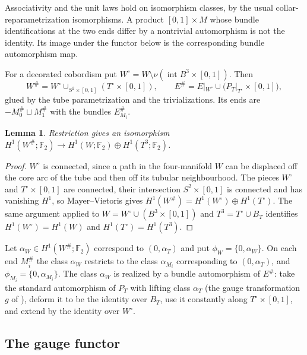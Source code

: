 \documentclass[11pt]{amsart}
\newtheorem{lemma}[theorem]{Lemma}
\theoremstyle{definition}
\theoremstyle{remark}
\theoremstyle{plain}
\numberwithin{equation}{section}
\newcommand{\FF}{\mathbb{F}_2}
\begin{document}
Associativity and the unit laws hold on isomorphism classes, by the
usual collar-reparametrization isomorphisms. A product
$[0,1]\times M$ whose bundle identifications at the two ends differ by a
nontrivial automorphism is not the identity. Its image under the functor
below is the corresponding bundle automorphism map.

For a decorated cobordism put $W^\circ=W\setminus\nu(\operatorname{int}
B^3\times[0,1])$. Then
\begin{equation}\label{eq:Wsharp}
W^\#=W^\circ\cup_{S^2\times[0,1]}(T^\circ\times[0,1]),\qquad
E^\#=E|_{W^\circ}\cup\bigl(P_T|_{T^\circ}\times[0,1]\bigr),
\end{equation}
glued by the tube parametrization and the trivializations. Its ends are
$-M_0^\#\sqcup M_1^\#$ with the bundles $E^\#_{M_i}$.

\begin{lemma}\label{lem:H1-sharp}
Restriction gives an isomorphism
$H^1(W^\#;\FF)\to H^1(W;\FF)\oplus H^1(T^3;\FF)$.
\end{lemma}

\begin{proof}
$W^\circ$ is connected, since a path in the four-manifold $W$ can be
displaced off the core arc of the tube and then off its tubular
neighbourhood. The pieces $W^\circ$ and $T^\circ\times[0,1]$ are
connected, their intersection $S^2\times[0,1]$ is connected and has
vanishing $H^1$, so Mayer--Vietoris gives
$H^1(W^\#)=H^1(W^\circ)\oplus H^1(T^\circ)$. The same argument applied to
$W=W^\circ\cup(B^3\times[0,1])$ and $T^3=T^\circ\cup B_T$ identifies
$H^1(W^\circ)=H^1(W)$ and $H^1(T^\circ)=H^1(T^3)$.
\end{proof}

Let $\alpha_W\in H^1(W^\#;\FF)$ correspond to $(0,\alpha_T)$ and put
$\phi_W=\{0,\alpha_W\}$. On each end $M_i^\#$ the class $\alpha_W$
restricts to the class $\alpha_{M_i}$ corresponding to $(0,\alpha_T)$,
and $\phi_{M_i}=\{0,\alpha_{M_i}\}$. The class $\alpha_W$ is realized by
a bundle automorphism of $E^\#$: take the standard automorphism of $P_T$
with lifting class $\alpha_T$ (the gauge transformation $g$ of
\cite[Section~7.1]{Scaduto}), deform it to be the identity over $B_T$,
use it constantly along $T^\circ\times[0,1]$, and extend by the identity
over $W^\circ$.

\subsection{The gauge functor}
\end{document}
